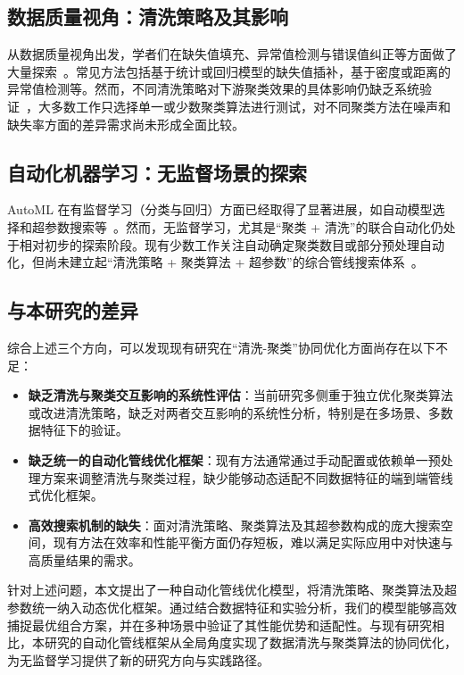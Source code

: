 \documentclass[8pt]{article} %
\numberwithin{equation}{section}
\begin{document}
\subsection{数据质量视角：清洗策略及其影响}
从数据质量视角出发，学者们在缺失值填充、异常值检测与错误值纠正等方面做了大量探索~\cite{ref5, ref6, ref7}。常见方法包括基于统计或回归模型的缺失值插补，基于密度或距离的异常值检测等。然而，不同清洗策略对下游聚类效果的具体影响仍缺乏系统验证~\cite{ref11, ref12}，大多数工作只选择单一或少数聚类算法进行测试，对不同聚类方法在噪声和缺失率方面的差异需求尚未形成全面比较。

\subsection{自动化机器学习：无监督场景的探索}
AutoML 在有监督学习（分类与回归）方面已经取得了显著进展，如自动模型选择和超参数搜索等~\cite{ref13, ref14}。然而，无监督学习，尤其是“聚类 + 清洗”的联合自动化仍处于相对初步的探索阶段。现有少数工作关注自动确定聚类数目或部分预处理自动化，但尚未建立起“清洗策略 + 聚类算法 + 超参数”的综合管线搜索体系~\cite{ref15, ref16}。

\subsection{与本研究的差异}
综合上述三个方向，可以发现现有研究在“清洗-聚类”协同优化方面尚存在以下不足：
\begin{itemize}
    \item \textbf{缺乏清洗与聚类交互影响的系统性评估}：当前研究多侧重于独立优化聚类算法或改进清洗策略，缺乏对两者交互影响的系统性分析，特别是在多场景、多数据特征下的验证。
    \item \textbf{缺乏统一的自动化管线优化框架}：现有方法通常通过手动配置或依赖单一预处理方案来调整清洗与聚类过程，缺少能够动态适配不同数据特征的端到端管线式优化框架。
    \item \textbf{高效搜索机制的缺失}：面对清洗策略、聚类算法及其超参数构成的庞大搜索空间，现有方法在效率和性能平衡方面仍存短板，难以满足实际应用中对快速与高质量结果的需求。
\end{itemize}

针对上述问题，本文提出了一种自动化管线优化模型，将清洗策略、聚类算法及超参数统一纳入动态优化框架。通过结合数据特征和实验分析，我们的模型能够高效捕捉最优组合方案，并在多种场景中验证了其性能优势和适配性。与现有研究相比，本研究的自动化管线框架从全局角度实现了数据清洗与聚类算法的协同优化，为无监督学习提供了新的研究方向与实践路径。

\end{document}

